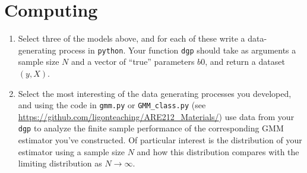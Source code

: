 \documentclass[12pt]{amsart}
\begin{document}
\section{Computing}
\label{sec:org0621867}
\begin{enumerate}
\item Select three of the models above, and for each of these
write a data-generating process in \texttt{python}.  Your function
\texttt{dgp} should take as arguments a sample size \(N\) and a vector of
``true'' parameters \(b0\), and return a dataset \((y,X)\).
\item Select the most interesting of the data generating processes you
developed, and using the code in \texttt{gmm.py} or \texttt{GMM\_class.py} (see
\url{https://github.com/ligonteaching/ARE212\_Materials/}) use data
from your \texttt{dgp} to analyze the finite sample performance of the
corresponding GMM estimator you've constructed.  Of particular
interest is the distribution of your estimator using a sample
size \(N\) and how this distribution compares with the limiting
distribution as \(N\rightarrow\infty\).
\end{enumerate}
\end{document}
